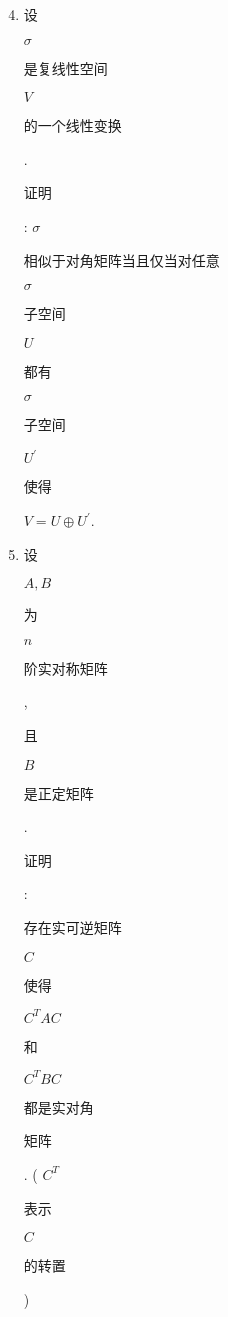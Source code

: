 \documentclass[10pt]{article}
\begin{document}
\begin{enumerate}
  \setcounter{enumi}{3}
  \item \begin{CJK}{UTF8}{mj}设\end{CJK} $\sigma$ \begin{CJK}{UTF8}{mj}是复线性空间\end{CJK} $V$ \begin{CJK}{UTF8}{mj}的一个线性变换\end{CJK}. \begin{CJK}{UTF8}{mj}证明\end{CJK}: $\sigma$ \begin{CJK}{UTF8}{mj}相似于对角矩阵当且仅当对任意\end{CJK} $\sigma$ \begin{CJK}{UTF8}{mj}子空间\end{CJK} $U$ \begin{CJK}{UTF8}{mj}都有\end{CJK} $\sigma$ \begin{CJK}{UTF8}{mj}子空间\end{CJK} $U^{\prime}$ \begin{CJK}{UTF8}{mj}使得\end{CJK} $V=U \oplus U^{\prime}$.

  \item \begin{CJK}{UTF8}{mj}设\end{CJK} $A, B$ \begin{CJK}{UTF8}{mj}为\end{CJK} $n$ \begin{CJK}{UTF8}{mj}阶实对称矩阵\end{CJK}, \begin{CJK}{UTF8}{mj}且\end{CJK} $B$ \begin{CJK}{UTF8}{mj}是正定矩阵\end{CJK}. \begin{CJK}{UTF8}{mj}证明\end{CJK}: \begin{CJK}{UTF8}{mj}存在实可逆矩阵\end{CJK} $C$ \begin{CJK}{UTF8}{mj}使得\end{CJK} $C^{T} A C$ \begin{CJK}{UTF8}{mj}和\end{CJK} $C^{T} B C$ \begin{CJK}{UTF8}{mj}都是实对角\end{CJK} \begin{CJK}{UTF8}{mj}矩阵\end{CJK}. ( $C^{T}$ \begin{CJK}{UTF8}{mj}表示\end{CJK} $C$ \begin{CJK}{UTF8}{mj}的转置\end{CJK})


\end{enumerate}
\end{document}

